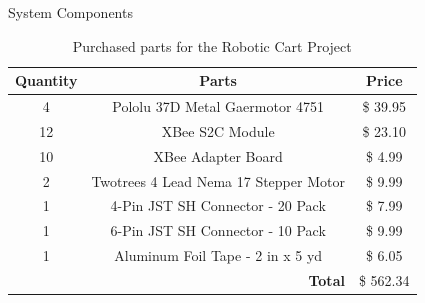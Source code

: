 \documentclass{beamer}
\begin{document}
\begin{frame}{System Components}
  \begin{table}[h!]
    \centering
    \begin{tabular}{c|c|c}
      \toprule
      \textbf{Quantity} & \textbf{Parts} & \textbf{Price}\\
      \toprule
      4 & Pololu 37D Metal Gaermotor 4751 & \$ 39.95\\
      12 & XBee S2C Module & \$ 23.10\\
      10 & XBee Adapter Board & \$ 4.99\\
      2 & Twotrees 4 Lead Nema 17 Stepper Motor & \$ 9.99\\
      1 & 4-Pin JST SH Connector - 20 Pack & \$ 7.99\\
      1 & 6-Pin JST SH Connector - 10 Pack & \$ 9.99\\
      1 & Aluminum Foil Tape - 2 in x 5 yd & \$ 6.05\\
      \bottomrule
      \multicolumn{2}{r|}{\textbf{Total}} & \$ 562.34\\
      \bottomrule
    \end{tabular}
    \caption{Purchased parts for the Robotic Cart Project}
    \label{tab:Partslist}
  \end{table}
\end{frame}
\end{document}
